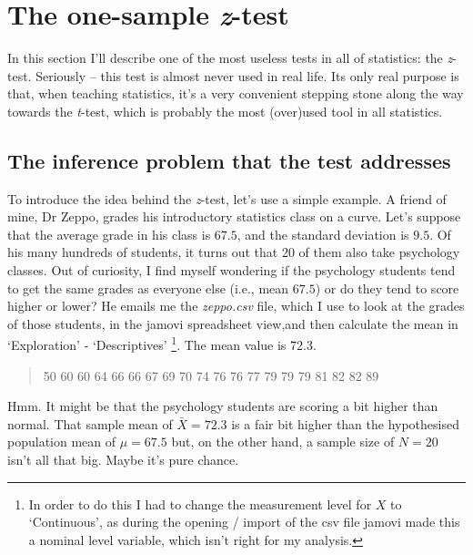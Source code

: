 \documentclass[
  a4paper,
]{book}
\begin{document}
\hypertarget{the-one-sample-z-test}{%
\section{\texorpdfstring{The one-sample
\emph{z}-test}{The one-sample z-test}}\label{the-one-sample-z-test}}

In this section I'll describe one of the most useless tests in all of
statistics: the \emph{z}-test. Seriously -- this test is almost never
used in real life. Its only real purpose is that, when teaching
statistics, it's a very convenient stepping stone along the way towards
the \emph{t}-test, which is probably the most (over)used tool in all
statistics.

\hypertarget{the-inference-problem-that-the-test-addresses}{%
\subsection{The inference problem that the test
addresses}\label{the-inference-problem-that-the-test-addresses}}

To introduce the idea behind the \emph{z}-test, let's use a simple
example. A friend of mine, Dr Zeppo, grades his introductory statistics
class on a curve. Let's suppose that the average grade in his class is
\(67.5\), and the standard deviation is \(9.5\). Of his many hundreds of
students, it turns out that 20 of them also take psychology classes. Out
of curiosity, I find myself wondering if the psychology students tend to
get the same grades as everyone else (i.e., mean \(67.5\)) or do they
tend to score higher or lower? He emails me the \emph{zeppo.csv} file,
which I use to look at the grades of those students, in the jamovi
spreadsheet view,and then calculate the mean in `Exploration' -
`Descriptives' \footnote{In order to do this I had to change the
  measurement level for \(X\) to `Continuous', as during the opening /
  import of the csv file jamovi made this a nominal level variable,
  which isn't right for my analysis.}. The mean value is \(72.3\).

\begin{quote}
50 60 60 64 66 66 67 69 70 74 76 76 77 79 79 79 81 82 82 89
\end{quote}

Hmm. It might be that the psychology students are scoring a bit higher
than normal. That sample mean of \(\bar{X} = 72.3\) is a fair bit higher
than the hypothesised population mean of \(\mu = 67.5\) but, on the
other hand, a sample size of \(N = 20\) isn't all that big. Maybe it's
pure chance.
\end{document}

